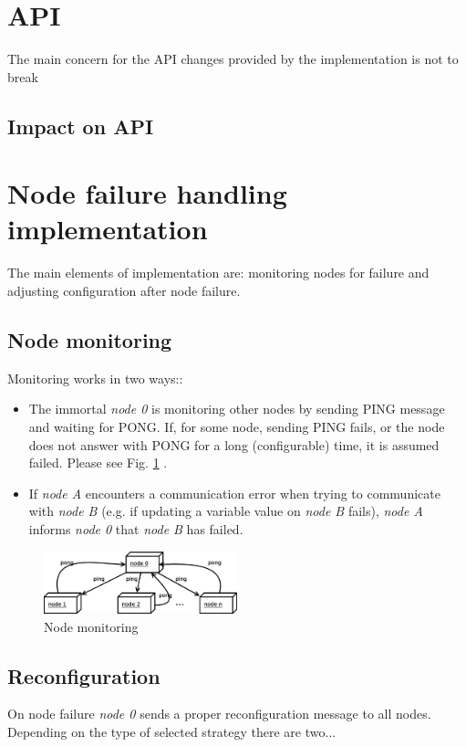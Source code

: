 \documentclass{llncs}
\begin{document}
\section{API}
The main concern for the API changes provided by the implementation is not to break

\subsection{Impact on API}

\section{Node failure handling implementation}

The main elements of implementation are: monitoring nodes for failure and adjusting configuration after node failure.

\subsection{Node monitoring}
Monitoring works in two ways::
\begin{itemize}
\item The immortal \textit{node 0} is monitoring other nodes by sending PING message and waiting for PONG.
If, for some node, sending PING fails, or the node does not answer with PONG for a long (configurable) time,
it is assumed failed. Please see Fig. \ref{pinging} .
\item
If \textit{node A} encounters a communication error when trying to communicate with \textit{node B}
(e.g. if updating a variable value on \textit{node B} fails), \textit{node A} informs \textit{node 0} that \textit{node B} has failed.

\end{itemize}

\begin{figure}
  \centering
      \includegraphics[width=0.5\textwidth]{node-monitoring.eps}
  \caption{Node monitoring}
  \label{pinging}
\end{figure}

\subsection{Reconfiguration}
On node failure \textit{node 0} sends a proper reconfiguration message to all nodes.
Depending on the type of selected strategy there are two...
\end{document}
